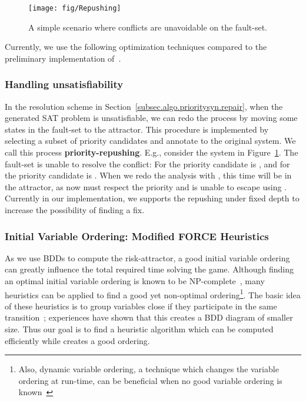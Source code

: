 \documentclass[10pt, a4paper, onecolumn, conference, compsocconf]{IEEEtran}
\begin{document}
\begin{figure}[t]
\centering
 \texttt{[image: fig/Repushing]}
  \caption{A simple scenario where conflicts are unavoidable on the fault-set.}
 \label{fig:vissbip.repushing}
\end{figure}

Currently, we use the following optimization techniques compared to the preliminary implementation of~\cite{cheng:vissbip:2011}.

\subsubsection{Handling unsatisfiability}
In the resolution scheme in Section~\ref{subsec.algo.prioritysyn.repair}, when the generated SAT problem is unsatisfiable, we can redo the process by moving some states in the fault-set to the attractor. This procedure is implemented by selecting a subset of priority candidates and annotate to the original system. We call this process \textbf{priority-repushing}. E.g., consider the system  in Figure~\ref{fig:vissbip.repushing}. The fault-set  is unable to resolve the conflict: For  the priority candidate is , and for  the priority candidate is . When we redo the analysis with , this time  will be in the attractor, as now  must respect the priority and is unable to escape using . Currently in our implementation, we supports the repushing under fixed depth to increase the possibility of finding a fix.

\subsubsection{Initial Variable Ordering: Modified FORCE Heuristics}
As we use BDDs to compute the risk-attractor, a good initial variable ordering can greatly influence the total required time solving the game. Although finding an optimal initial variable ordering is known to be NP-complete~\cite{tani1993complexity}, many heuristics can be applied to find a good yet non-optimal ordering\footnote{Also, dynamic variable ordering, a technique which changes the variable ordering at run-time, can be beneficial when no good variable ordering is known~\cite{clarke1999mc}}. The basic idea of these heuristics is to group variables close if they participate in the same transition~\cite{clarke1999mc}; experiences have shown that this creates a BDD diagram of smaller size. Thus our goal is to find a heuristic algorithm which can be computed efficiently while creates a good ordering.
\end{document}

